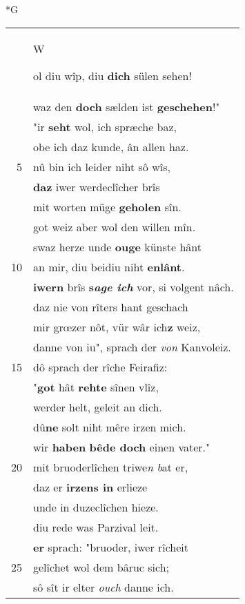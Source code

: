\documentclass[8pt,a4paper,notitlepage]{article}
\begin{document}
\newpage
\begin{table}[ht]
\begin{minipage}[t]{0.5\linewidth}
\small
\begin{center}*G
\end{center}
\begin{tabular}{rl}
 & \begin{large}W\end{large}ol diu wîp, diu \textbf{dich} sülen sehen!\\ 
 & waz den \textbf{doch} sælden ist \textbf{geschehen}!"\\ 
 & "ir \textbf{seht} wol, ich spræche baz,\\ 
 & obe ich daz kunde, ân allen haz.\\ 
5 & nû bin ich leider niht sô wîs,\\ 
 & \textbf{daz} iwer werdeclîcher brîs\\ 
 & mit worten müge \textbf{geholen} sîn.\\ 
 & got weiz aber wol den willen mîn.\\ 
 & swaz herze unde \textbf{ouge} künste hânt\\ 
10 & an mir, diu beidiu niht \textbf{enlânt}.\\ 
 & \textbf{iwern} brîs \textbf{s\textit{age ich}} vor, si volgent nâch.\\ 
 & daz nie von rîters hant geschach\\ 
 & mir grœzer nôt, vür wâr ich\textbf{z} weiz,\\ 
 & danne von iu", sprach der \textit{von} Kanvoleiz.\\ 
15 & dô sprach der rîche Feirafiz:\\ 
 & "\textbf{got} hât \textbf{rehte} sînen vlîz,\\ 
 & werder helt, geleit an dich.\\ 
 & dû\textbf{ne} solt niht mêre irzen mich.\\ 
 & wir \textbf{haben} \textbf{bêde doch} einen vater."\\ 
20 & mit bruoderlîchen triwe\textit{n} \textit{b}at er,\\ 
 & daz er \textbf{irzens in} erlieze\\ 
 & unde in duzeclîchen hieze.\\ 
 & diu rede was Parzival leit.\\ 
 & \textbf{er} sprach: "bruoder, iwer rîcheit\\ 
25 & gelîchet wol dem bâruc sich;\\ 
 & sô sît ir elter \textit{ouch} danne ich.\\ 

\end{tabular}
\end{minipage}
\end{table}
\end{document}
